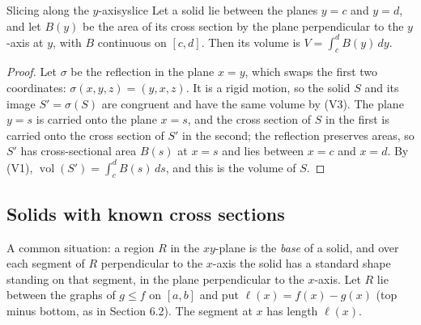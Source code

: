 \documentclass[11pt]{article}
\begin{document}
\begin{thm}{Slicing along the $y$-axis}{yslice}
Let a solid lie between the planes $y=c$ and $y=d$, and let $B(y)$ be the area of its cross section by the plane perpendicular to the $y$-axis at $y$, with $B$ continuous on $[c,d]$. Then its volume is $V=\int_c^dB(y)\,dy$.
\end{thm}
\begin{proof}
Let $\sigma$ be the reflection in the plane $x=y$, which swaps the first two coordinates: $\sigma(x,y,z)=(y,x,z)$. It is a rigid motion, so the solid $S$ and its image $S'=\sigma(S)$ are congruent and have the same volume by (V3). The plane $y=s$ is carried onto the plane $x=s$, and the cross section of $S$ in the first is carried onto the cross section of $S'$ in the second; the reflection preserves areas, so $S'$ has cross-sectional area $B(s)$ at $x=s$ and lies between $x=c$ and $x=d$. By (V1), $\operatorname{vol}(S')=\int_c^dB(s)\,ds$, and this is the volume of $S$.
\end{proof}

\subsection*{Solids with known cross sections}

A common situation: a region $R$ in the $xy$-plane is the \emph{base} of a solid, and over each segment of $R$ perpendicular to the $x$-axis the solid has a standard shape standing on that segment, in the plane perpendicular to the $x$-axis. Let $R$ lie between the graphs of $g\le f$ on $[a,b]$ and put $\ell(x)=f(x)-g(x)$ (top minus bottom, as in Section 6.2). The segment at $x$ has length $\ell(x)$.
\end{document}
